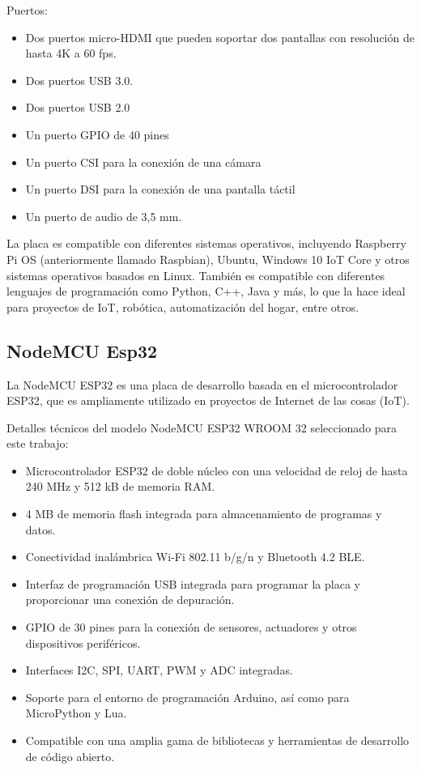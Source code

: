Puertos:
\begin{itemize}
\item Dos puertos micro-HDMI que pueden soportar dos pantallas con resolución de hasta 4K a 60 fps.
\item Dos puertos USB 3.0.
\item Dos puertos USB 2.0
\item Un puerto GPIO de 40 pines
\item Un puerto CSI para la conexión de una cámara
\item Un puerto DSI para la conexión de una pantalla táctil
\item Un puerto de audio de 3,5 mm.
\end{itemize}

La placa es compatible con diferentes sistemas operativos, incluyendo Raspberry Pi OS (anteriormente llamado Raspbian), Ubuntu, Windows 10 IoT Core y otros sistemas operativos basados en Linux. También es compatible con diferentes lenguajes de programación como Python, C++, Java y más, lo que la hace ideal para proyectos de IoT, robótica, automatización del hogar, entre otros.

\subsection{NodeMCU Esp32}
\label{subsec:esp32}

La NodeMCU ESP32 \cite{ESP32-DOC} es una placa de desarrollo basada en el microcontrolador ESP32, que es ampliamente utilizado en proyectos de Internet de las cosas (IoT). 

Detalles técnicos del modelo NodeMCU ESP32 WROOM 32 seleccionado para este trabajo:

\begin{itemize}
\item Microcontrolador ESP32 de doble núcleo con una velocidad de reloj de hasta 240 MHz y 512 kB de memoria RAM.
\item 4 MB de memoria flash integrada para almacenamiento de programas y datos.
\item Conectividad inalámbrica Wi-Fi 802.11 b/g/n y Bluetooth 4.2 BLE.
\item Interfaz de programación USB integrada para programar la placa y proporcionar una conexión de depuración.
\item GPIO de 30 pines para la conexión de sensores, actuadores y otros dispositivos periféricos.
\item Interfaces I2C, SPI, UART, PWM y ADC integradas.
\item Soporte para el entorno de programación Arduino, así como para MicroPython y Lua.
\item Compatible con una amplia gama de bibliotecas y herramientas de desarrollo de código abierto.
\end{itemize}

